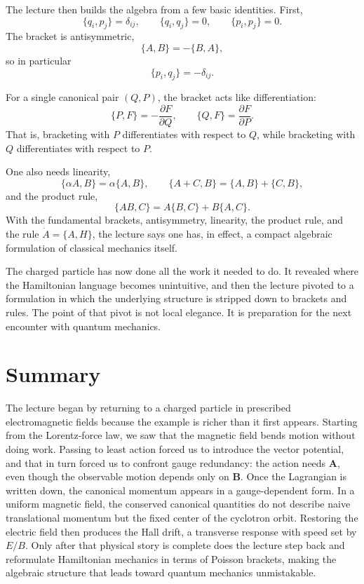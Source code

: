 The lecture then builds the algebra from a few basic identities. First,
\begin{equation}
\{q_i,p_j\}=\delta_{ij},
\qquad
\{q_i,q_j\}=0,
\qquad
\{p_i,p_j\}=0.
\end{equation}
The bracket is antisymmetric,
\begin{equation}
\{A,B\}=-\{B,A\},
\end{equation}
so in particular
\begin{equation}
\{p_i,q_j\}=-\delta_{ij}.
\end{equation}

For a single canonical pair \((Q,P)\), the bracket acts like differentiation:
\begin{equation}
\{P,F\}=-\frac{\partial F}{\partial Q},
\qquad
\{Q,F\}=\frac{\partial F}{\partial P}.
\end{equation}
That is, bracketing with \(P\) differentiates with respect to \(Q\), while bracketing with \(Q\) differentiates with respect to \(P\).

One also needs linearity,
\begin{equation}
\{\alpha A,B\}=\alpha\{A,B\},
\qquad
\{A+C,B\}=\{A,B\}+\{C,B\},
\end{equation}
and the product rule,
\begin{equation}
\{AB,C\}=A\{B,C\}+B\{A,C\}.
\end{equation}
With the fundamental brackets, antisymmetry, linearity, the product rule, and the rule \(\dot A=\{A,H\}\), the lecture says one has, in effect, a compact algebraic formulation of classical mechanics itself.

The charged particle has now done all the work it needed to do. It revealed where the Hamiltonian language becomes unintuitive, and then the lecture pivoted to a formulation in which the underlying structure is stripped down to brackets and rules. The point of that pivot is not local elegance. It is preparation for the next encounter with quantum mechanics.

\section{Summary}

The lecture began by returning to a charged particle in prescribed electromagnetic fields because the example is richer than it first appears. Starting from the Lorentz-force law, we saw that the magnetic field bends motion without doing work. Passing to least action forced us to introduce the vector potential, and that in turn forced us to confront gauge redundancy: the action needs \(\mathbf A\), even though the observable motion depends only on \(\mathbf B\). Once the Lagrangian is written down, the canonical momentum appears in a gauge-dependent form. In a uniform magnetic field, the conserved canonical quantities do not describe naive translational momentum but the fixed center of the cyclotron orbit. Restoring the electric field then produces the Hall drift, a transverse response with speed set by \(E/B\). Only after that physical story is complete does the lecture step back and reformulate Hamiltonian mechanics in terms of Poisson brackets, making the algebraic structure that leads toward quantum mechanics unmistakable.